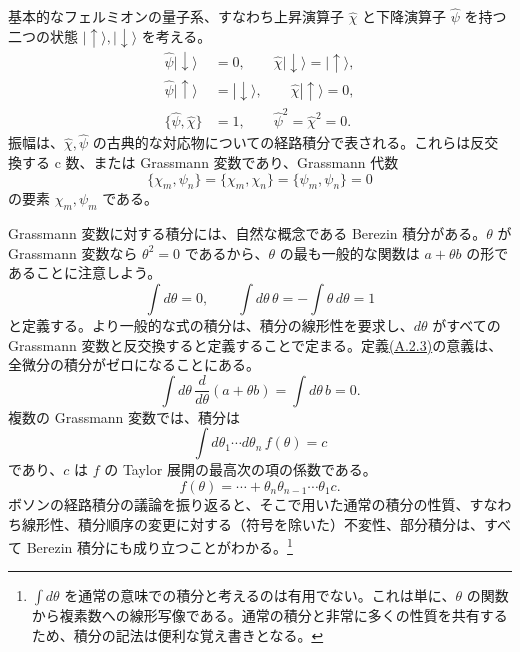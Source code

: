 基本的なフェルミオンの量子系、すなわち上昇演算子 $\hat\chi$ と下降演算子 $\hat\psi$ を持つ二つの状態 $\lvert\uparrow\rangle,\lvert\downarrow\rangle$ を考える。
\begin{align}
\hat\psi|\downarrow\rangle&=0,\qquad
\hat\chi|\downarrow\rangle=|\uparrow\rangle,
\tag{A.2.1a}\label{eq:A.2.1a}\\
\hat\psi|\uparrow\rangle&=|\downarrow\rangle,\qquad
\hat\chi|\uparrow\rangle=0,
\tag{A.2.1b}\label{eq:A.2.1b}\\
\{\hat\psi,\hat\chi\}&=1,\qquad\hat\psi^2=\hat\chi^2=0.
\tag{A.2.1c}\label{eq:A.2.1c}
\end{align}
振幅は、$\hat\chi,\hat\psi$ の古典的な対応物についての経路積分で表される。これらは反交換する c 数、または Grassmann 変数であり、Grassmann 代数
\begin{equation}
\{\chi_m,\psi_n\}=\{\chi_m,\chi_n\}=\{\psi_m,\psi_n\}=0
\tag{A.2.2}\label{eq:A.2.2}
\end{equation}
の要素 $\chi_m,\psi_m$ である。

Grassmann 変数に対する積分には、自然な概念である Berezin 積分がある。$\theta$ が Grassmann 変数なら $\theta^2=0$ であるから、$\theta$ の最も一般的な関数は $a+\theta b$ の形であることに注意しよう。
\begin{equation}
\int d\theta=0,\qquad
\int d\theta\,\theta=-\int\theta\,d\theta=1
\tag{A.2.3}\label{eq:A.2.3}
\end{equation}
と定義する。より一般的な式の積分は、積分の線形性を要求し、$d\theta$ がすべての Grassmann 変数と反交換すると定義することで定まる。定義\hyperref[eq:A.2.3]{(A.2.3)}の意義は、全微分の積分がゼロになることにある。
\begin{equation}
\int d\theta\,\frac d{d\theta}(a+\theta b)
=\int d\theta\,b=0.
\tag{A.2.4}\label{eq:A.2.4}
\end{equation}
複数の Grassmann 変数では、積分は
\begin{equation}
\int d\theta_1\cdots d\theta_n\,f(\theta)=c
\tag{A.2.5}\label{eq:A.2.5}
\end{equation}
であり、$c$ は $f$ の Taylor 展開の最高次の項の係数である。
\begin{equation}
f(\theta)=\cdots+\theta_n\theta_{n-1}\cdots\theta_1c.
\tag{A.2.6}\label{eq:A.2.6}
\end{equation}
ボソンの経路積分の議論を振り返ると、そこで用いた通常の積分の性質、すなわち線形性、積分順序の変更に対する（符号を除いた）不変性、部分積分は、すべて Berezin 積分にも成り立つことがわかる。\footnote[3]{$\int d\theta$ を通常の意味での積分と考えるのは有用でない。これは単に、$\theta$ の関数から複素数への線形写像である。通常の積分と非常に多くの性質を共有するため、積分の記法は便利な覚え書きとなる。}

